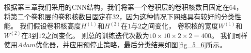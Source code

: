 根据第三章我们采用的CNN结构，我们将第一个卷积层的卷积核数目固定在$64$，
将第二个卷积层的卷积核数目固定在$32$，因为这种情况下网络具有较好的分类性能。
我们假设卷积核高度$H^{(1)}$和$H^{(2)}$在$1$与$2$之间变化，
卷积核的宽度$W^{(1)}$和$W^{(2)}$在$3$到$12$之间变化。
则总的训练迭代次数为$10 \times 10 \times 2 \times 2 = 400$。
我们同样使用$Adam$优化器，并应用预停止策略，最后分类结果如图\ref{fig_5_6}所示。\par
\begin{figure}[!h]
	\centering
	\\

\end{figure}
